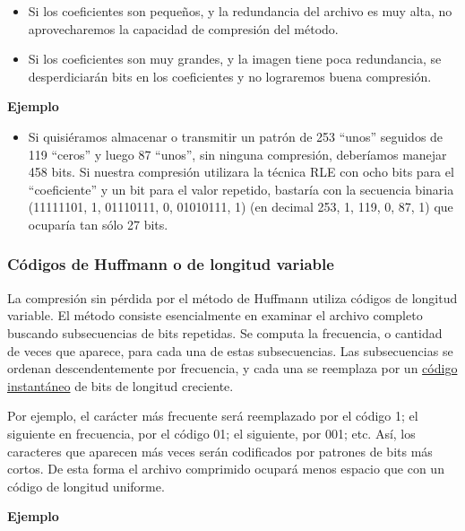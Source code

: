 \documentclass[spanish,a4paper,]{article}
\providecommand{\tightlist}{%
  \setlength{\itemsep}{0pt}\setlength{\parskip}{0pt}}
\begin{document}
\begin{itemize}
\tightlist
\item
  Si los coeficientes son pequeños, y la redundancia del archivo es muy
  alta, no aprovecharemos la capacidad de compresión del método.
\item
  Si los coeficientes son muy grandes, y la imagen tiene poca
  redundancia, se desperdiciarán bits en los coeficientes y no
  lograremos buena compresión.
\end{itemize}

\textbf{Ejemplo}

\begin{itemize}
\tightlist
\item
  Si quisiéramos almacenar o transmitir un patrón de 253 ``unos''
  seguidos de 119 ``ceros'' y luego 87 ``unos'', sin ninguna compresión,
  deberíamos manejar 458 bits. Si nuestra compresión utilizara la
  técnica RLE con ocho bits para el ``coeficiente'' y un bit para el
  valor repetido, bastaría con la secuencia binaria (11111101, 1,
  01110111, 0, 01010111, 1) (en decimal 253, 1, 119, 0, 87, 1) que
  ocuparía tan sólo 27 bits.
\end{itemize}

\hypertarget{cuxf3digos-de-huffmann-o-de-longitud-variable}{%
\subsubsection{Códigos de Huffmann o de longitud
variable}\label{cuxf3digos-de-huffmann-o-de-longitud-variable}}

La compresión sin pérdida por el método de Huffmann utiliza códigos de
longitud variable. El método consiste esencialmente en examinar el
archivo completo buscando subsecuencias de bits repetidas. Se computa la
frecuencia, o cantidad de veces que aparece, para cada una de estas
subsecuencias. Las subsecuencias se ordenan descendentemente por
frecuencia, y cada una se reemplaza por un
\href{https://es.m.wikipedia.org/wiki/C\%C3\%B3digo_prefijo}{código
instantáneo} de bits de longitud creciente.

Por ejemplo, el carácter más frecuente será reemplazado por el código 1;
el siguiente en frecuencia, por el código 01; el siguiente, por 001;
etc. Así, los caracteres que aparecen más veces serán codificados por
patrones de bits más cortos. De esta forma el archivo comprimido ocupará
menos espacio que con un código de longitud uniforme.

\textbf{Ejemplo}
\end{document}
